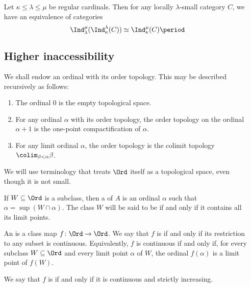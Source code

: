 \begin{eg}
	Let $ \kappa \leq \lambda \leq \mu $ be regular cardinals.
	Then for any locally $ \lambda $-small category $ C $,
	we have an equivalence of categories
	\[ \Ind_{\lambda}^{\mu}(\Ind_{\kappa}^{\lambda}(C)) \simeq \Ind_{\kappa}^{\mu}(C) \period \]
\end{eg}

\subsection{Higher inaccessibility}%
\label{sub:higher_inaccessibility}

\begin{nul}
	We shall endow an ordinal with its order topology.
	This may be described recursively as follows:
	\begin{enumerate}
		\item The ordinal $ 0 $ is the empty topological space.
		\item For any ordinal $ \alpha $ with its order topology,
			the order topology on the ordinal $ \alpha + 1 $
			is the one-point compactification of $ \alpha $.
		\item For any limit ordinal $ \alpha $,
			the order topology is the colimit topology
			$ \colim_{\beta < \alpha} \beta $.
	\end{enumerate}
\end{nul}

We will use terminology 
that treats $ \Ord $ itself as a topological space,
even though it is not small.

\begin{definition}
	If $ W \subseteq \Ord $ is a subclass,
	then a  of $ A $ is
	an ordinal $ \alpha $ such that $ \alpha = \sup (W \cap \alpha) $.
	The class $ W $ will be said to be  if and only if
	it contains all its limit points.

	An  is a class map $ f \colon \Ord \to \Ord $.
	We say that $ f $ is  if and only if
	its restriction to any subset is continuous.
	Equivalently, $ f $ is continuous if and only if,
	for every subclass $ W \subseteq \Ord $
	and every limit point $ \alpha $ of $ W $,
	the ordinal $ f(\alpha) $ is a limit point of $ f(W) $.

	We say that $ f $ is  if and only if
	it is continuous and strictly increasing.
\end{definition}

